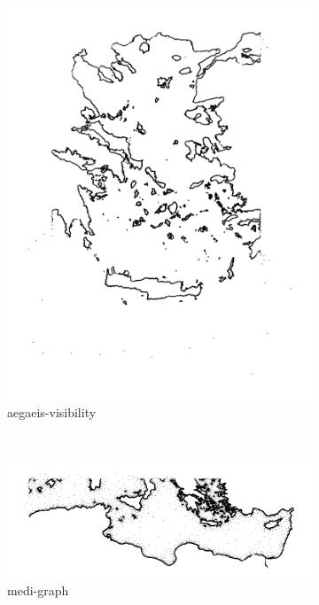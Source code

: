 \begin{figure}[ht]
\begin{subfigure}[b]{0.35\textwidth}
        \includegraphics[width=\textwidth]{img/base_graphs/aegaeis-ref-visibility.png}
        \caption{aegaeis-visibility}
    \end{subfigure}
    \\
    \begin{subfigure}[b]{0.35\textwidth}
        \centering
        \includegraphics[width=\textwidth]{img/base_graphs/medi-ref-graph.png}
        \caption{medi-graph}
    \end{subfigure}
    \hfill
    \begin{subfigure}[b]{0.35\textwidth}

\end{subfigure}
\end{figure}
